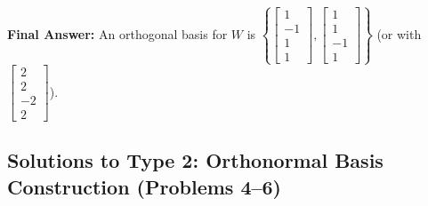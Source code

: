 \documentclass[11pt, letterpaper]{article}
\theoremstyle{definition}
\theoremstyle{remark}
\begin{document}
\textbf{Final Answer:} An orthogonal basis for $W$ is $\left\{ \begin{bmatrix} 1 \\ -1 \\ 1 \\ 1 \end{bmatrix}, \begin{bmatrix} 1 \\ 1 \\ -1 \\ 1 \end{bmatrix} \right\}$ (or with $\begin{bmatrix} 2 \\ 2 \\ -2 \\ 2 \end{bmatrix}$).

\subsection{Solutions to Type 2: Orthonormal Basis Construction (Problems 4--6)}
\end{document}
